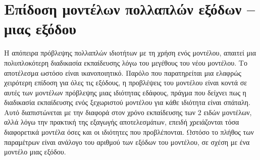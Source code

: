 \section{Επίδοση μοντέλων πολλαπλών εξόδων -- μιας εξόδου}
Η απόπειρα πρόβλεψης πολλαπλών ιδιοτήτων με τη χρήση ενός μοντέλου, απαιτεί μια πολυπλοκότερη διαδικασία εκπαίδευσης λόγω του μεγέθους του νέου μοντέλου. Το αποτέλεσμα ωστόσο είναι ικανοποιητικό. Παρόλο που παρατηρείται μια ελαφρώς χειρότερη επίδοση για όλες τις εξόδους, η προβλέψεις του μοντέλου είναι κοντά σε αυτές των μοντέλων πρόβλεψης μιας ιδιότητας εδάφους, πράγμα που δείχνει πως η διαδικασία εκπαίδευσης ενός ξεχωριστού μοντέλου για κάθε ιδιότητα είναι σπάταλη. Αυτό διαπιστώνεται με την διαφορά στον χρόνο εκπαίδευσης των 2 ειδών μοντέλων, αλλά λόγω την πρακτική της εξαγωγής αποτελεσμάτων, επειδή χρειάζονται τόσα διαφορετικά μοντέλα όσες και οι ιδιότητες που προβλέπονται. Ωστόσο το πλήθος των παραμέτρων είναι ανάλογο του αριθμού των εξόδων του μοντέλου, σε σχέση με ένα μοντέλο μιας εξόδου.

